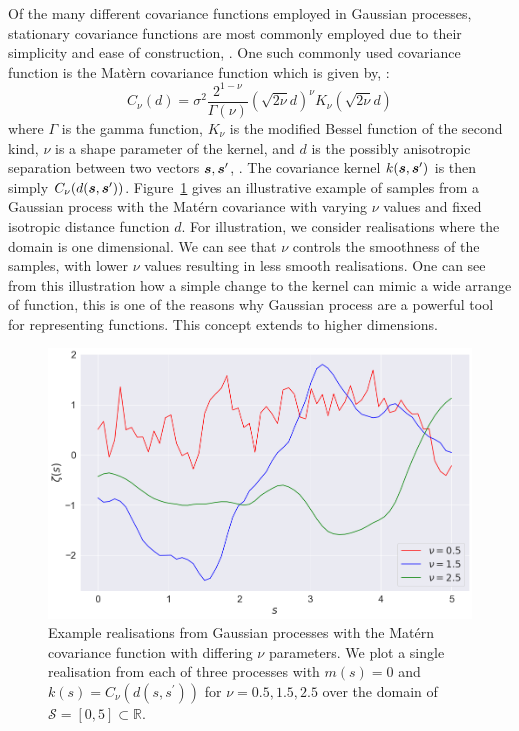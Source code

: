 Of the many different covariance functions employed in Gaussian processes, stationary covariance functions are most commonly employed due to their simplicity and ease of construction, \citep{cressie_statistics_2015}.
One such commonly used covariance function is the Mat\`{e}rn covariance function which is given by, \citep{abramowitz_handbook_2013}: 
\begin{equation}\label{eqn:mat}
	C_\nu(d) = \sigma^2 \frac{2^{1-\nu}}{\Gamma(\nu)} \left(\sqrt{2\nu}d\right)^\nu K_\nu \left( \sqrt{2\nu}d \right) 
\end{equation}
where $\Gamma$ is the gamma function, $K_\nu$ is the modified Bessel function of the second kind, $\nu$ is a shape parameter of the kernel, and $d$ is the possibly anisotropic separation between two vectors $\bm{{s}}, \bm{{s}}^{\prime}$, \citep{abramowitz_handbook_2013}. 
The covariance kernel $k(\bm{{s}}, \bm{{s}}^{\prime})$ is then simply $C_\nu(d(\bm{{s}}, \bm{{s}}^{\prime}))$.
Figure~\ref{fig:example_matern} gives an illustrative example of samples from a Gaussian process with the Mat\'ern covariance with varying $\nu$ values and fixed isotropic distance function $d$.
For illustration, we consider realisations where the domain is one dimensional.
We can see that $\nu$ controls the smoothness of the samples, with lower $\nu$ values resulting in less smooth realisations.
One can see from this illustration how a simple change to the kernel can mimic a wide arrange of function, this is one of the reasons why Gaussian process are a powerful tool for representing functions.
This concept extends to higher dimensions.

\begin{figure}[htbp!] 
	\centering    
	\includegraphics[width=1.0\textwidth]{example_kernel}
	\caption[Example realisations from Gaussian processes with the Mat\'ern covariance function with differing $\nu$ parameters.]{Example realisations from Gaussian processes with the Mat\'ern covariance function with differing $\nu$ parameters. We plot a single realisation from each of three processes with $m(s) = 0$ and $k(s) = C_\nu(d(s, s^\prime))$ for $\nu = 0.5, 1.5, 2.5$ over the domain of $\mathcal{S} = \left[0, 5\right] \subset \mathbb{R}$.}
	\label{fig:example_matern}
\end{figure}

